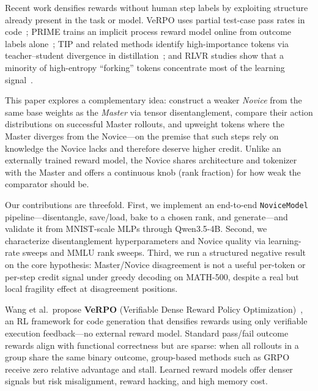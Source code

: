 \documentclass[times, 10pt,twocolumn]{article}
\begin{document}
Recent work densifies rewards without human step labels by exploiting structure
already present in the task or model. VeRPO uses partial test-case pass rates in
code~\cite{wang2026verpo}; PRIME trains an implicit process reward model online
from outcome labels alone~\cite{cui2025prime}; TIP and related methods identify
high-importance tokens via teacher--student divergence in
distillation~\cite{xu2026tip}; and RLVR studies show that a minority of
high-entropy ``forking'' tokens concentrate most of the learning
signal~\cite{wang2025forking}.

This paper explores a complementary idea: construct a weaker \emph{Novice} from
the same base weights as the \emph{Master} via tensor disentanglement, compare
their action distributions on successful Master rollouts, and upweight tokens
where the Master diverges from the Novice---on the premise that such steps rely
on knowledge the Novice lacks and therefore deserve higher credit. Unlike an
externally trained reward model, the Novice shares architecture and tokenizer
with the Master and
offers a continuous knob (rank fraction) for how weak the comparator should be.

Our contributions are threefold. First, we implement an end-to-end
\texttt{NoviceModel} pipeline---disentangle, save/load, bake to a chosen rank,
and generate---and validate it from MNIST-scale MLPs through Qwen3.5-4B.
Second, we characterize disentanglement hyperparameters and Novice quality via
learning-rate sweeps and MMLU rank sweeps. Third, we run a structured negative
result on the core hypothesis: Master/Novice disagreement is not a useful
per-token or per-step credit signal under greedy decoding on MATH-500, despite a
real but local fragility effect at disagreement positions.




Wang et al.\ propose \textbf{VeRPO} (Verifiable Dense Reward Policy
Optimization)~\cite{wang2026verpo}, an RL framework for code generation that
densifies rewards using only verifiable execution feedback---no external reward
model. Standard pass/fail outcome rewards align with functional correctness but
are sparse: when all rollouts in a group share the same binary outcome, group-based
methods such as GRPO receive zero relative advantage and stall. Learned reward
models offer denser signals but risk misalignment, reward hacking, and high
memory cost.
\end{document}
